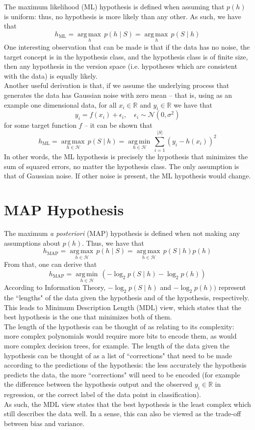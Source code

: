 \documentclass[12pt]{article}
\newcommand{\argmax}[1]{\underset{#1}{\operatorname{arg\,max\,}}}
\newcommand{\argmin}[1]{\underset{#1}{\operatorname{arg\,min\,}}}
\begin{document}
The maximum likelihood (ML) hypothesis is defined when assuming that $p(h)$ is uniform: thus, no hypothesis is more likely than any other. As such, we have that
\[ h_\text{ML} = \argmax{h}p(h \mid S) = \argmax{h}p(S \mid h) \]
One interesting observation that can be made is that if the data has no noise, the target concept is in the hypothesis class, and the hypothesis class is of finite size, then any hypothesis in the version space (i.e. hypotheses which are consistent with the data) is equally likely.
\\\newline
Another useful derivation is that, if we assume the underlying process that generates the data has Gaussian noise with zero mean -- that is, using as an example one dimensional data, for all $x_i \in \mathbb{R}$ and $y_i \in \mathbb{R}$ we have that
\[ y_i = f(x_i) + \epsilon_i, \quad \epsilon_i \sim \mathcal{N}(0, \sigma^2) \]
for some target function $f$ -- it can be shown that
\[ h_\text{ML} = \argmax{h \in \mathcal{H}}p(S \mid h) = \argmin{h \in \mathcal{H}}\sum_{i=1}^{|S|}(y_i - h(x_i))^2 \]
In other words, the ML hypothesis is precisely the hypothesis that minimizes the sum of squared errors, no matter the hypothesis class. The only assumption is that of Gaussian noise. If other noise is present, the ML hypothesis would change.

\section{MAP Hypothesis}

The maximum \textit{a posteriori} (MAP) hypothesis is defined when not making any assumptions about $p(h)$. Thus, we have that
\[ h_\text{MAP} = \argmax{h \in \mathcal{H}}p(h \mid S) = \argmax{h \in \mathcal{H}}p(S \mid h)p(h) \]
From that, one can derive that
\[ h_\text{MAP} = \argmin{h \in \mathcal{H}}(-\log_2p(S \mid h) - \log_2p(h)) \]
According to Information Theory, $-\log_2p(S \mid h)$ and $-\log_2p(h))$ represent the ``lengths" of the data given the hypothesis and of the hypothesis, respectively. This leads to Minimum Description Length (MDL) view, which states that the best hypothesis is the one that minimizes both of them.
\\\newline
The length of the hypothesis can be thought of as relating to its complexity: more complex polynomials would require more bits to encode them, as would more complex decision trees, for example. The length of the data given the hypothesis can be thought of as a list of ``corrections" that need to be made according to the predictions of the hypothesis: the less accurately the hypothesis predicts the data, the more ``corrections" will need to be encoded (for example the difference between the hypothesis output and the observed $y_i \in \mathbb{R}$ in regression, or the correct label of the data point in classification).
\\\newline
As such, the MDL view states that the best hypothesis is the least complex which still describes the data well. In a sense, this can also be viewed as the trade-off between bias and variance.
\end{document}

